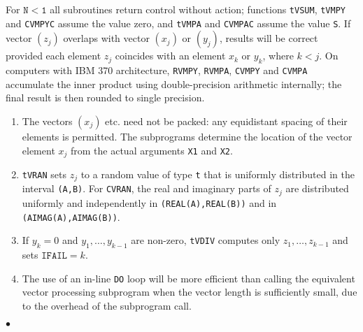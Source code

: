 For $\mathtt{N < 1}$ all subroutines return control without action;
functions {\tt tVSUM}, {\tt tVMPY} and {\tt CVMPYC} assume the value
zero, and {\tt tVMPA} and {\tt CVMPAC} assume the value {\tt S}.
\Restrict
If vector $(z_j)$ overlaps with vector $(x_j)$ or $(y_j)$, results will
be correct provided each element $z_j$ coincides with an element $x_k$
or $y_k$, where $k<j$.
\Accuracy
On computers with IBM 370 architecture, {\tt RVMPY}, {\tt RVMPA},
{\tt CVMPY} and {\tt CVMPA} accumulate the inner product using
double-precision arithmetic internally; the final result is then rounded
to single precision.
\Notes
\begin{enumerate}
\item The vectors $(x_j)$ etc. need not be packed: any equidistant
spacing of their elements is permitted. The subprograms determine the
location of the vector element $x_j$ from the actual arguments
{\tt X1} and {\tt X2}.
\item {\tt tVRAN} sets $z_j$ to a random value of type {\tt t} that is
uniformly distributed in the interval {\tt (A,B)}. For {\tt CVRAN}, the
real and imaginary parts of $z_j$ are distributed uniformly and
independently in {\tt (REAL(A),REAL(B))} and in
{\tt (AIMAG(A),AIMAG(B))}.
\item If $y_k = 0$ and $y_1,\ldots,y_{k-1}$ are non-zero, {\tt tVDIV}
computes only $z_1,\ldots,z_{k-1}$ and sets $\mathtt{IFAIL} = k$.
\item The use of an in-line {\tt DO} loop will be more efficient than
calling the equivalent vector processing subprogram when the vector
length is sufficiently small, due to the overhead of the subprogram call.
\end{enumerate}
$\bullet$
